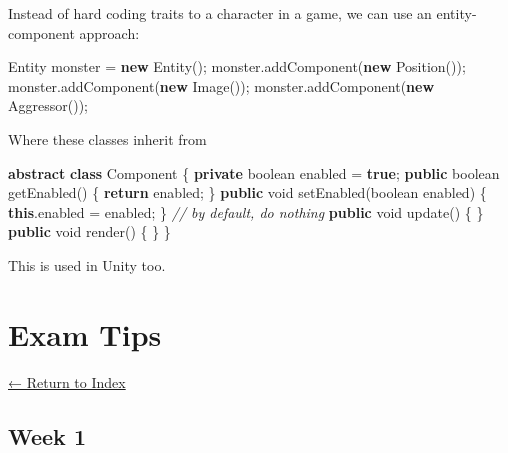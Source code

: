 \documentclass[]{article}
\newenvironment{Shaded}{}{}
\newcommand{\BuiltInTok}[1]{#1}
\newcommand{\CommentTok}[1]{\textcolor[rgb]{0.38,0.63,0.69}{\textit{#1}}}
\newcommand{\DataTypeTok}[1]{\textcolor[rgb]{0.56,0.13,0.00}{#1}}
\newcommand{\FunctionTok}[1]{\textcolor[rgb]{0.02,0.16,0.49}{#1}}
\newcommand{\KeywordTok}[1]{\textcolor[rgb]{0.00,0.44,0.13}{\textbf{#1}}}
\newcommand{\NormalTok}[1]{#1}
\begin{document}
Instead of hard coding traits to a character in a game, we can use an
entity-component approach:

\begin{Shaded}
\begin{Highlighting}[]
\BuiltInTok{Entity}\NormalTok{ monster = }\KeywordTok{new} \BuiltInTok{Entity}\NormalTok{();}
\NormalTok{monster.}\FunctionTok{addComponent}\NormalTok{(}\KeywordTok{new} \BuiltInTok{Position}\NormalTok{());}
\NormalTok{monster.}\FunctionTok{addComponent}\NormalTok{(}\KeywordTok{new} \BuiltInTok{Image}\NormalTok{());}
\NormalTok{monster.}\FunctionTok{addComponent}\NormalTok{(}\KeywordTok{new} \FunctionTok{Aggressor}\NormalTok{());}
\end{Highlighting}
\end{Shaded}

Where these classes inherit from

\begin{Shaded}
\begin{Highlighting}[]
\KeywordTok{abstract} \KeywordTok{class} \BuiltInTok{Component}\NormalTok{ \{}
    \KeywordTok{private} \DataTypeTok{boolean}\NormalTok{ enabled = }\KeywordTok{true}\NormalTok{;}
    \KeywordTok{public} \DataTypeTok{boolean} \FunctionTok{getEnabled}\NormalTok{() \{}
        \KeywordTok{return}\NormalTok{ enabled;}
\NormalTok{    \}}
    \KeywordTok{public} \DataTypeTok{void} \FunctionTok{setEnabled}\NormalTok{(}\DataTypeTok{boolean}\NormalTok{ enabled) \{}
        \KeywordTok{this}\NormalTok{.}\FunctionTok{enabled}\NormalTok{ = enabled;}
\NormalTok{    \}}
    \CommentTok{// by default, do nothing}
    \KeywordTok{public} \DataTypeTok{void} \FunctionTok{update}\NormalTok{() \{ \}}
    \KeywordTok{public} \DataTypeTok{void} \FunctionTok{render}\NormalTok{() \{ \}}
\NormalTok{\}}
\end{Highlighting}
\end{Shaded}

This is used in Unity too.

\hypertarget{exam-tips}{%
\section{Exam Tips}\label{exam-tips}}

\protect\hyperlink{table-of-contents}{← Return to Index}

\hypertarget{week-1}{%
\subsection{Week 1}\label{week-1}}
\end{document}

